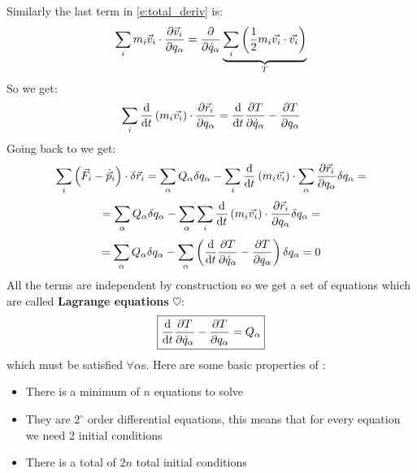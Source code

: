 Similarly the last term in \eqref{e:total_deriv} is:
\begin{equation}
    \displaystyle\sum_im_i\vec{v}_i \cdot \dfrac{\partial \vec{v}_i}{\partial q_{\alpha}} = \dfrac{\partial }{\partial \dot{q}_{\alpha}} \underbrace{\displaystyle\sum_i \left(\dfrac{1}{2}m_i \vec{v_i} \cdot \vec{v_i}\right)}_{T}
\end{equation}
So we get:
\begin{equation}
    \bigsum_i \dv{}{t}\brackets{m_i\vec{v_i}}\cdot \dfrac{\partial \vec{r}_i}{\partial q_{\alpha}} = \dv{}{t}\dfrac{\partial T}{\partial \dot{q}_{\alpha}} - \dfrac{\partial T}{\partial q_{\alpha}}
\end{equation}
Going back to \dalambertref\;we get:
\begin{equation}
    \bigsum_i \brackets{\vec{F}_i - \dvec{p}_i} \cdot \delta \vec{r}_i = \bigsum_{\alpha}Q_{\alpha}\delta q_{\alpha} - \bigsum_i \dv{}{t}\brackets{m_i\vec{v_i}} \cdot \bigsum_{\alpha}\dfrac{\partial \vec{r}_i}{\partial q_{\alpha}}\delta q_{\alpha} =
\end{equation}
\begin{equation}
    = \bigsum_{\alpha}Q_{\alpha}\delta q_{\alpha} - \bigsum_{\alpha}\bigsum_i \dv{}{t}\brackets{m_i\vec{v_i}} \cdot \dfrac{\partial \vec{r}_i}{\partial q_{\alpha}}\delta q_{\alpha} =
\end{equation}
\begin{equation}
    = \bigsum_{\alpha}Q_{\alpha}\delta q_{\alpha} - \bigsum_{\alpha}\brackets{\dv{}{t}\dfrac{\partial T}{\partial \dot{q}_{\alpha}} - \dfrac{\partial T}{\partial q_{\alpha}}}\delta q_{\alpha} = 0
\end{equation}
All the terms are independent by construction so we get a set of equations which are called \textbf{Lagrange equations} $\heartsuit$:
\begin{equation} \label{Lagrange_equations}
    \boxed{\dv{}{t}\dfrac{\partial T}{\partial \dot{q}_{\alpha}} - \dfrac{\partial T}{\partial q_{\alpha}} = Q_{\alpha}}
\end{equation}
which must be satisfied $\forall \alpha$s.
Here are some basic properties of \lagrangeref :
\begin{itemize}
    \item There is a minimum of $n$ equations to solve
    \item They are $2^\circ$ order differential equations, this means that for every equation we need 2 initial conditions
    \item There is a total of $2n$ total initial conditions
\end{itemize}
